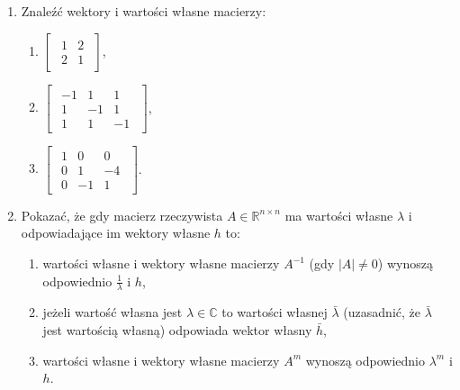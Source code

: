 \documentclass{article}
\begin{document}
\begin{enumerate}
    \item Znaleźć wektory i wartości własne macierzy:
        \begin{enumerate}
            \item $\begin{bmatrix}\begin{array}{rr} 1 & 2\\ 2 & 1 \end{array}\end{bmatrix}$,
            \item $\begin{bmatrix}\begin{array}{rrr} -1 & 1 & 1\\ 1 & -1 & 1\\ 1 & 1 & -1 \end{array}\end{bmatrix}$,
            \item $\begin{bmatrix}\begin{array}{rrr} 1 & 0 & 0\\ 0 & 1 & -4\\ 0 & -1 & 1 \end{array}\end{bmatrix}$.
        \end{enumerate}

    \item Pokazać, że gdy macierz rzeczywista $A \in \mathbb{R}^{n \times n}$ ma wartości własne $\lambda$ i odpowiadające im wektory własne $h$ to:
        \begin{enumerate}
            \item wartości własne i wektory własne macierzy $A^{-1}$ (gdy $|A| \neq 0$) wynoszą odpowiednio $\frac{1}{\lambda}$ i $h$,
            \item jeżeli wartość własna jest $\lambda \in \mathbb{C}$ to wartości własnej $\bar{\lambda}$ (uzasadnić, że $\bar{\lambda}$ jest wartością własną) odpowiada wektor własny $\bar{h}$,
            \item wartości własne i wektory własne macierzy $A^{m}$ wynoszą odpowiednio $\lambda^{m}$ i $h$.
        \end{enumerate}
    
\end{enumerate}
\end{document}
